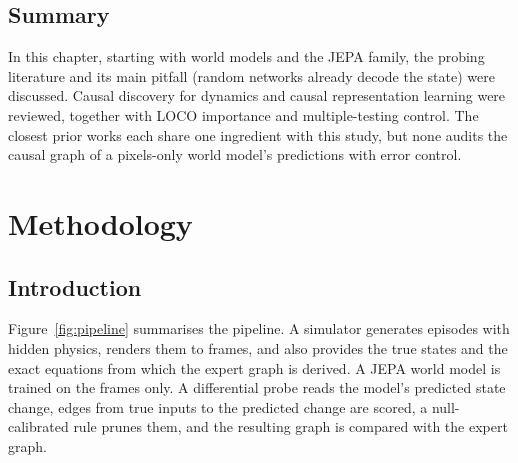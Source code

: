 \documentclass[11pt, a4paper, oneside,enumerate,textcomp]{report}
\begin{document}
\section{Summary}

In this chapter, starting with world models and the JEPA family, the probing literature and its main pitfall (random networks already decode the state) were discussed. Causal discovery for dynamics and causal representation learning were reviewed, together with LOCO importance and multiple-testing control. The closest prior works each share one ingredient with this study, but none audits the causal graph of a pixels-only world model's predictions with error control.


\chapter{Methodology}
\thispagestyle{empty}

\section{Introduction}

Figure~\ref{fig:pipeline} summarises the pipeline. A simulator generates episodes with hidden physics, renders them to frames, and also provides the true states and the exact equations from which the expert graph is derived. A JEPA world model is trained on the frames only. A differential probe reads the model's predicted state change, edges from true inputs to the predicted change are scored, a null-calibrated rule prunes them, and the resulting graph is compared with the expert graph.
\end{document}
